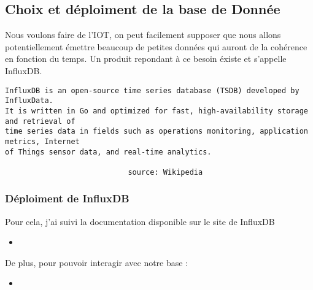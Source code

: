 \documentclass[10pt,a4paper]{article}
\newcommand{\insertcode}[2]{\begin{itemize}\item[]\end{itemize}}
\begin{document}
 \subsection{Choix et déploiment de la base de Donnée}
 Nous voulons faire de l'IOT, on peut facilement supposer que nous allons potentiellement émettre beaucoup de petites données qui auront de la cohérence en fonction du temps. Un produit repondant à ce besoin éxiste et s'appelle InfluxDB. 
\begin{lstlisting}
InfluxDB is an open-source time series database (TSDB) developed by InfluxData.
It is written in Go and optimized for fast, high-availability storage and retrieval of
time series data in fields such as operations monitoring, application metrics, Internet
of Things sensor data, and real-time analytics. 

                            source: Wikipedia 
\end{lstlisting}
\subsubsection{Déploiment de InfluxDB}
Pour cela, j'ai suivi la documentation disponible sur le site de InfluxDB
\insertcode{commande/installinflux.txt}{Installation de InfluxDB}
De plus, pour pouvoir interagir avec notre base :
\insertcode{commande/installclient.txt}{Installation du client}
\end{document}

